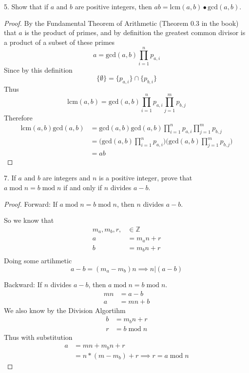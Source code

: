 5. Show that if $a$ and $b$ are positive integers, then $ab = \text{lcm}(a,b) \bullet \text{gcd}(a,b)$.

\begin{proof}
By the Fundamental Theorem of Arithmetic (Theorem 0.3 in the book) that $a$ is the product of primes, and by definition the greatest common divisor is a product of a subset of these primes
\[ a = \text{gcd}(a,b)\prod_{i=1}^{n} p_{a,i}\]
Since by this definition
\[\{\emptyset\} = \{p_{a,i}\} \cap \{p_{b,i}\}  \]
Thus 
\[\text{lcm}(a,b)= \text{gcd}(a,b)\prod_{i=1}^{n} p_{a,i} \prod_{j=1}^{m} p_{b,j}\]
Therefore
\begin{align*}
\text{lcm}(a,b) \text{gcd}(a,b) &= \text{gcd}(a,b)\text{gcd}(a,b)\prod_{i=1}^{n} p_{a,i} \prod_{j=1}^{m} p_{b,j} \\
&= \big(\text{gcd}(a,b) \prod_{i=1}^{n} p_{a,i} \big)\big( \text{gcd}(a,b)\prod_{j=1}^{m} p_{b,j}\big) \\
&= ab
\end{align*}
\end{proof}

7. If $a$ and $b$ are integers and $n$ is a positive integer, prove that $ a \;\mathrm{mod}\; n = b \;\mathrm{mod}\; n$ if and only if $n$ divides $a-b$.

\begin{proof}
Forward: If $ a \;\mathrm{mod}\; n = b \;\mathrm{mod}\; n$, then $n$ divides $a-b$. 

So we know that
\begin{align*}
m_a, m_b, r, &\in \mathbb{Z} \\
a &= m_an + r \\
b &= m_bn + r \\
\end{align*}
Doing some artihmetic
\[ a - b = (m_a - m_b)n \implies n | (a - b)\]

Backward: If $n$ divides $a-b$, then $ a \;\mathrm{mod}\; n = b \;\mathrm{mod}\; n$.
\begin{align*}
mn &= a - b \\
a &= mn +b 
\end{align*}
We also know by the Division Algortihm
\begin{align*}
b &= m_bn + r \\
r &= b\;\mathrm{mod}\; n
\end{align*}
Thus with substitution
\begin{align*}
a &= mn + m_bn + r \\
&= n*(m - m_b) +r \implies r = a\;\mathrm{mod}\; n
\end{align*}
\end{proof}

